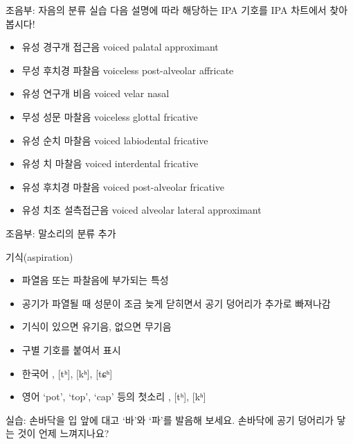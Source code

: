 \documentclass[11pt, aspectratio=169]{beamer}
\newcommand{\textds}[1]{{\ipafont #1}}
\begin{document}
\begin{frame}[t]{조음부: 자음의 분류 실습}
    다음 설명에 따라 해당하는 IPA 기호를 IPA 차트에서 찾아봅시다!
    \begin{itemize}
        \item 유성 경구개 접근음 voiced palatal approximant \textds{[ ]}
        \item 무성 후치경 파찰음 voiceless post-alveolar affricate \textds{[ ]}
        \item 유성 연구개 비음 voiced velar nasal \textds{[ ]}
        \item 무성 성문 마찰음 voiceless glottal fricative \textds{[ ]}
        \item 유성 순치 마찰음 voiced labiodental fricative \textds{[ ]}
        \item 유성 치 마찰음 voiced interdental fricative \textds{[ ]}
        \item 유성 후치경 마찰음 voiced post-alveolar fricative  \textds{[ ]}
        \item 유성 치조 설측접근음 voiced alveolar lateral approximant \textds{[ ]}
    \end{itemize}
\end{frame}

\begin{frame}[t]{조음부: 말소리의 분류 추가}
    \begin{block}{기식(aspiration)}
        \begin{itemize}
            \item 파열음 또는 파찰음에 부가되는 특성
            \item 공기가 파열될 때 성문이 조금 늦게 닫히면서 공기 덩어리가 추가로 빠져나감
            \item 기식이 있으면 유기음, 없으면 무기음
            \item \textds{[ ʰ]} 구별 기호를 붙여서 표시
            \item 한국어 \textds{[pʰ], [tʰ], [kʰ], [tɕʰ]}
            \item 영어 ‘pot’, ‘top’, ‘cap’ 등의 첫소리 \textds{[pʰ], [tʰ], [kʰ]}
        \end{itemize}
    \end{block}
    {\small 실습: 손바닥을 입 앞에 대고 ‘바’와 ‘파’를 발음해 보세요. 손바닥에 공기 덩어리가 닿는 것이 언제 느껴지나요?}
\end{frame}
\end{document}
